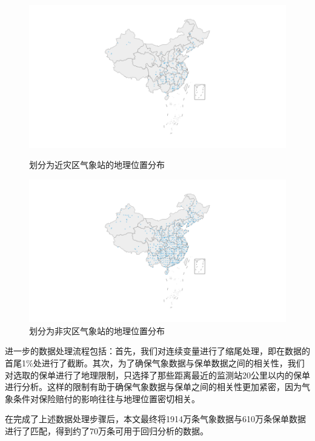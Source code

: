 \begin{figure}[H]
    \begin{minipage}{0.48\linewidth}
        \includegraphics[width=\textwidth, trim=200 0 200 0]{lib/img/middle.png}
        \caption{划分为近灾区气象站的地理位置分布}
    \end{minipage}
    \begin{minipage}{0.48\linewidth}
        \includegraphics[width=\textwidth, trim=200 0 200 0]{lib/img/far.png}
        \caption{划分为非灾区气象站的地理位置分布}
    \end{minipage}
\end{figure}
进一步的数据处理流程包括：首先，我们对连续变量进行了缩尾处理，即在数据的首尾1\%处进行了截断。其次，为了确保气象数据与保单数据之间的相关性，我们对选取的保单进行了地理限制，只选择了那些距离最近的监测站20公里以内的保单进行分析。这样的限制有助于确保气象数据与保单之间的相关性更加紧密，因为气象条件对保险赔付的影响往往与地理位置密切相关。

在完成了上述数据处理步骤后，本文最终将1914万条气象数据与610万条保单数据进行了匹配，得到约了70万条可用于回归分析的数据。

